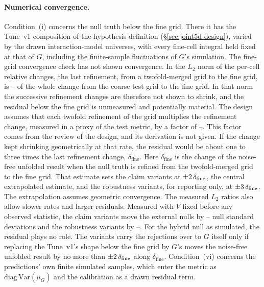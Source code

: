 \paragraph{Numerical convergence.} Condition~(i) concerns the null truth below the fine grid. There it has the Tune~v1 composition of the hypothesis definition (\S\ref{sec:joint5d-design}), varied by the drawn interaction-model universes, with every fine-cell integral held fixed at that of $G$, including the finite-sample fluctuations of $G$'s simulation. The fine-grid convergence check has not shown convergence. In the $L_{2}$ norm of the per-cell relative changes, the last refinement, from a twofold-merged grid to the fine grid, is \jtMoneMin--\jtMoneMax{} of the whole change from the coarse test grid to the fine grid. In that norm the successive refinement changes are therefore not shown to shrink, and the residual below the fine grid is unmeasured and potentially material. The design assumes that each twofold refinement of the grid multiplies the refinement change, measured in a proxy of the test metric, by a factor of \jtMoneWnormMin--\jtMoneWnormMax{}. This factor comes from the review of the design, and its derivation is not given. If the change kept shrinking geometrically at that rate, the residual would be about one to three times the last refinement change, $\delta_{\mathrm{fine}}$. Here $\delta_{\mathrm{fine}}$ is the change of the noise-free unfolded result when the null truth is refined from the twofold-merged grid to the fine grid. That estimate sets the claim variants at $\pm2\,\delta_{\mathrm{fine}}$, the central extrapolated estimate, and the robustness variants, for reporting only, at $\pm3\,\delta_{\mathrm{fine}}$. The extrapolation assumes geometric convergence. The measured $L_{2}$ ratios also allow slower rates and larger residuals. Measured with $V$ fixed before any observed statistic, the claim variants move the external nulls by \jtMoneClaimSdMin--\jtMoneClaimSdMax{} null standard deviations and the robustness variants by \jtMoneRobSdMin--\jtMoneRobSdMax{}. For the hybrid null as simulated, the residual plays no role. The variants carry the rejections over to $G$ itself only if replacing the Tune~v1's shape below the fine grid by $G$'s moves the noise-free unfolded result by no more than $\pm2\,\delta_{\mathrm{fine}}$ along $\delta_{\mathrm{fine}}$. Condition~(vi) concerns the predictions' own finite simulated samples, which enter the metric as $\mathrm{diag}\,\mathrm{Var}(\mu_{G})$ and the calibration as a drawn residual term.

